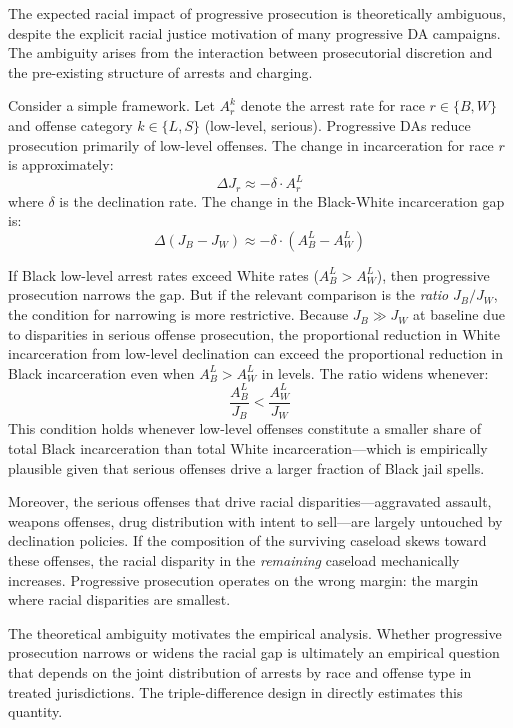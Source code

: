 \documentclass[12pt]{article}
\begin{document}
The expected racial impact of progressive prosecution is theoretically ambiguous, despite the explicit racial justice motivation of many progressive DA campaigns. The ambiguity arises from the interaction between prosecutorial discretion and the pre-existing structure of arrests and charging.

Consider a simple framework. Let $A_r^k$ denote the arrest rate for race $r \in \{B, W\}$ and offense category $k \in \{L, S\}$ (low-level, serious). Progressive DAs reduce prosecution primarily of low-level offenses. The change in incarceration for race $r$ is approximately:
\begin{equation}
\Delta J_r \approx -\delta \cdot A_r^L
\end{equation}
where $\delta$ is the declination rate. The change in the Black-White incarceration gap is:
\begin{equation}
\Delta(J_B - J_W) \approx -\delta \cdot (A_B^L - A_W^L)
\end{equation}

If Black low-level arrest rates exceed White rates ($A_B^L > A_W^L$), then progressive prosecution narrows the gap. But if the relevant comparison is the \textit{ratio} $J_B / J_W$, the condition for narrowing is more restrictive. Because $J_B \gg J_W$ at baseline due to disparities in serious offense prosecution, the proportional reduction in White incarceration from low-level declination can exceed the proportional reduction in Black incarceration even when $A_B^L > A_W^L$ in levels. The ratio widens whenever:
\begin{equation}
\frac{A_B^L}{J_B} < \frac{A_W^L}{J_W}
\end{equation}
This condition holds whenever low-level offenses constitute a smaller share of total Black incarceration than total White incarceration---which is empirically plausible given that serious offenses drive a larger fraction of Black jail spells.

Moreover, the serious offenses that drive racial disparities---aggravated assault, weapons offenses, drug distribution with intent to sell---are largely untouched by declination policies. If the composition of the surviving caseload skews toward these offenses, the racial disparity in the \textit{remaining} caseload mechanically increases. Progressive prosecution operates on the wrong margin: the margin where racial disparities are smallest.

The theoretical ambiguity motivates the empirical analysis. Whether progressive prosecution narrows or widens the racial gap is ultimately an empirical question that depends on the joint distribution of arrests by race and offense type in treated jurisdictions. The triple-difference design in  directly estimates this quantity.
\end{document}
